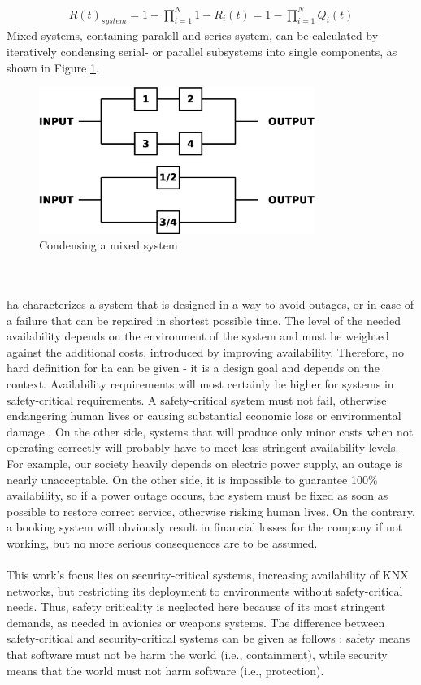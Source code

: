 \begin{align}\label{parallelSysEqu}
 R(t)_{system} = 1 - \prod_{i=1}^{N} 1- R_{i}(t) = 1 - \prod_{i=1}^{N} Q_{i}(t)
\end{align}
Mixed systems, containing paralell and series system, can be calculated by iteratively condensing serial- or parallel subsystems into single components,
as shown in Figure \ref{fig:mixedSys}.
\begin{figure}
    \centering
    \includegraphics[width=0.8\textwidth]{figures/mixedSys.eps}
    \caption{Condensing a mixed system}
    \label{fig:mixedSys}
\end{figure}
\\
\\
\gls{ha} characterizes a system that is designed in a way to avoid outages, or in case of a failure that can be repaired in shortest possible time. 
The level of the needed availability depends on the environment of the system and must be weighted against the additional costs, introduced by improving availability.
Therefore, no hard definition for \gls{ha} can be given - it is a design goal and depends on the context. Availability requirements will most certainly be higher
for systems in safety-critical requirements. A safety-critical system must not fail, otherwise endangering human lives or 
causing substantial economic loss or environmental damage \cite{1007998}.
On the other side, systems that will produce only minor costs when not operating correctly
will probably have to meet less stringent availability levels.
\\
For example, our society heavily depends on electric power supply, an outage
is nearly unacceptable. On the other side, it is impossible to guarantee 100\% availability, so if a power outage occurs, the system must be fixed as soon as
possible to restore correct service, otherwise risking human lives. On the contrary, a booking system will obviously result in financial losses for the company 
if not working, but no more serious consequences are to be assumed.
\\
\\
This work's focus lies on security-critical systems, increasing availability of KNX networks, but restricting its
deployment to environments without safety-critical needs. Thus, safety criticality is neglected here because of its most stringent demands, as needed in
avionics or weapons systems.
The difference between safety-critical and security-critical systems can be given as follows \cite{5784222}: safety means that software must not be harm the 
world (i.e., containment), while security means that the world must not harm software (i.e., protection).

